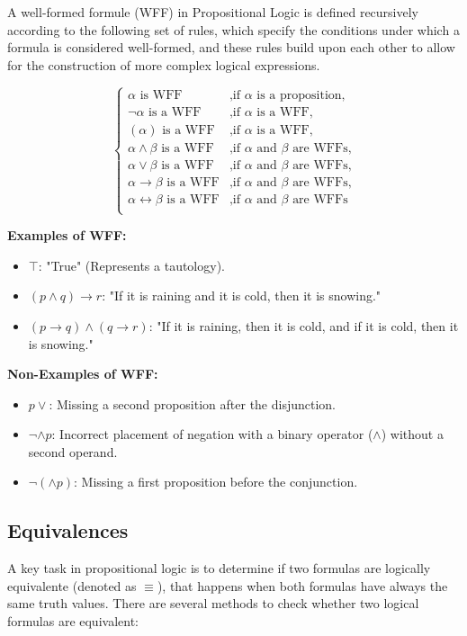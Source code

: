 A well-formed formule (WFF) in Propositional Logic is defined recursively according to the following set of rules, which specify the conditions under which a formula is considered well-formed, and these rules build upon each other to allow for the construction of more complex logical expressions.

\[
\left\{
\begin{array}{ll}
\alpha \text{ is WFF} & \text{,if } \alpha \text{ is a proposition,}\\
\neg \alpha \text{ is a WFF} & \text{,if } \alpha \text{ is a WFF,}\\
(\alpha) \text{ is a WFF} & \text{,if } \alpha \text{ is a WFF,}\\
\alpha \land \beta \text{ is a WFF} & \text{,if } \alpha \text{ and } \beta \text{ are WFFs,}\\
\alpha \lor \beta \text{ is a WFF} & \text{,if } \alpha \text{ and } \beta \text{ are WFFs,} \\
\alpha \rightarrow \beta \text{ is a WFF} & \text{,if } \alpha \text{ and } \beta \text{ are WFFs,} \\
\alpha \leftrightarrow \beta \text{ is a WFF} & \text{,if } \alpha \text{ and } \beta \text{ are WFFs} \\
\end{array}
\right.
\]

\textbf{Examples of WFF:}
\begin{itemize}
    \item \(\top\): "True" (Represents a tautology).
    \item \((p \land q) \to r\): "If it is raining and it is cold, then it is snowing."
    \item \((p \to q) \land (q \to r)\): "If it is raining, then it is cold, and if it is cold, then it is snowing."
\end{itemize}

\textbf{Non-Examples of WFF:}
\begin{itemize}
    \item \(p \lor \): Missing a second proposition after the disjunction.
    \item \(\neg \land p\): Incorrect placement of negation with a binary operator (\(\land\)) without a second operand.
    \item \(\neg (\land p)\): Missing a first proposition before the conjunction.
\end{itemize}

\subsection{Equivalences}
\label{chap:prop-equivalences}
A key task in propositional logic is to determine if two formulas are logically equivalente (denoted as \(\equiv\)), that happens when both formulas have always the same truth values. There are several methods to check whether two logical formulas are equivalent: 

